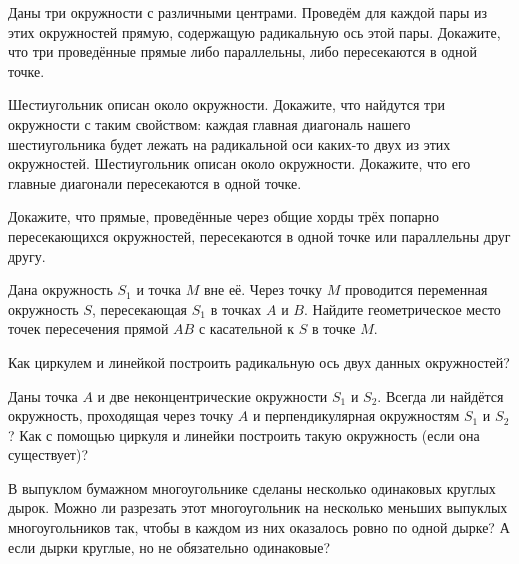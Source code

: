 \documentclass[a4paper,12pt]{article}
\begin{document}

Даны три окружности с различными центрами. Проведём для каждой пары из этих окружностей прямую, содержащую радикальную ось этой пары. Докажите, что три проведённые прямые либо параллельны, либо пересекаются в одной точке.

Шестиугольник описан около окружности. Докажите, что найдутся три окружности с таким свойством: каждая главная диагональ нашего шестиугольника будет лежать
на радикальной оси каких-то двух из этих окружностей.
Шестиугольник описан около окружности. Докажите, что его главные диагонали пересекаются в одной точке.

Докажите, что прямые, проведённые через общие хорды трёх попарно пересекающихся окружностей, пересекаются в одной точке или параллельны друг другу.

Дана окружность $S_1$ и точка $M$ вне её. Через точку $M$ проводится переменная окружность $S$, пересекающая $S_1$ в точках $A$ и $B$. Найдите геометрическое место точек пересечения прямой $AB$ с касательной к $S$ в точке $M$.

Как циркулем и линейкой построить радикальную ось двух данных окружностей?

Даны точка $A$ и две неконцентрические окружности $S_1$ и $S_2$. Всегда ли найдётся окружность, проходящая через точку $A$ и перпендикулярная окружностям $S_1$ и $S_2$?
Как с помощью циркуля и линейки построить такую окружность (если она существует)?

 В выпуклом бумажном многоугольнике сделаны несколько одинаковых круглых дырок. Можно ли разрезать этот многоугольник на несколько меньших выпуклых многоугольников так, чтобы в каждом из них оказалось ровно по одной дырке?
 А если дырки круглые, но не обязательно одинаковые?

\end{document}
